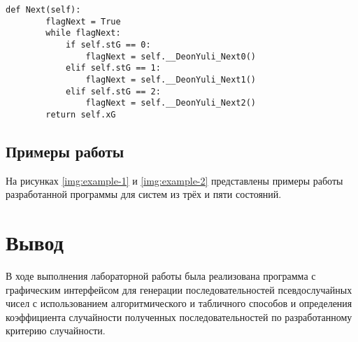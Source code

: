 \begin{center}
\captionsetup{justification=raggedright,singlelinecheck=off}
\begin{lstlisting}[label=lst:algorithm,caption=Реализация алгоритимческого спосба]
def Next(self):
        flagNext = True
        while flagNext:
            if self.stG == 0:
                flagNext = self.__DeonYuli_Next0()
            elif self.stG == 1:
                flagNext = self.__DeonYuli_Next1()
            elif self.stG == 2:
                flagNext = self.__DeonYuli_Next2()
        return self.xG
\end{lstlisting}
\end{center}

\subsection*{Примеры работы}

На рисунках \ref{img:example-1} и \ref{img:example-2} представлены примеры работы разработанной программы для систем из трёх и пяти состояний.



\section*{Вывод}

В ходе выполнения лабораторной работы была реализована программа с графическим интерфейсом для генерации последовательностей псевдослучайных чисел с использованием алгоритмического и табличного способов и определения коэффициента случайности полученных последовательностей по разработанному критерию случайности.

